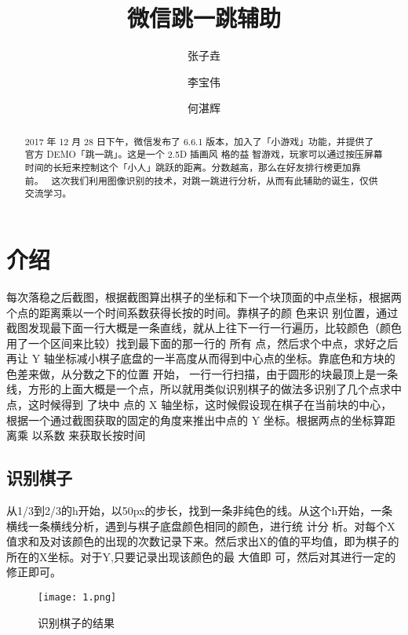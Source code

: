 \documentclass[UTF8,10pt,twocolumn,letterpaper]{article}
\begin{document}
\title{微信跳一跳辅助}

\author{张子垚\\
\and
李宝伟\\
\and
何湛辉\\
}

\maketitle

\begin{abstract}
   2017 年 12 月 28 日下午，微信发布了 6.6.1 版本，加入了「小游戏」功能，并提供了官方 DEMO「跳一跳」。这是一个 2.5D 插画风
   格的益
   智游戏，玩家可以通过按压屏幕时间的长短来控制这个「小人」跳跃的距离。分数越高，那么在好友排行榜更加靠前。~\cite{Authors14}
   这次我们利用图像识别的技术，对跳一跳进行分析，从而有此辅助的诞生，仅供交流学习。
\end{abstract}

\section{介绍}

每次落稳之后截图，根据截图算出棋子的坐标和下一个块顶面的中点坐标，根据两个点的距离乘以一个时间系数获得长按的时间。靠棋子的颜
色来识
别位置，通过截图发现最下面一行大概是一条直线，就从上往下一行一行遍历，比较颜色（颜色用了一个区间来比较）找到最下面的那一行的
所有
点，然后求个中点，求好之后再让 Y 轴坐标减小棋子底盘的一半高度从而得到中心点的坐标。靠底色和方块的色差来做，从分数之下的位置
开始，
一行一行扫描，由于圆形的块最顶上是一条线，方形的上面大概是一个点，所以就用类似识别棋子的做法多识别了几个点求中点，这时候得到
了块中
点的 X 轴坐标，这时候假设现在棋子在当前块的中心，根据一个通过截图获取的固定的角度来推出中点的 Y 坐标。根据两点的坐标算距离乘
以系数
来获取长按时间
\subsection{识别棋子}

从1/3到2/3的h开始，以50px的步长，找到一条非纯色的线。从这个h开始，一条横线一条横线分析，遇到与棋子底盘颜色相同的颜色，进行统
计分
析。对每个X值求和及对该颜色的出现的次数记录下来。然后求出X的值的平均值，即为棋子的所在的X坐标。对于Y,只要记录出现该颜色的最
大值即
可，然后对其进行一定的修正即可。
\begin{figure}[t]
\begin{center}
   \texttt{[image: 1.png]}
\end{center}
   \caption{识别棋子的结果}
\label{fig:long}
\label{fig:onecol}
\end{figure}
\end{document}
